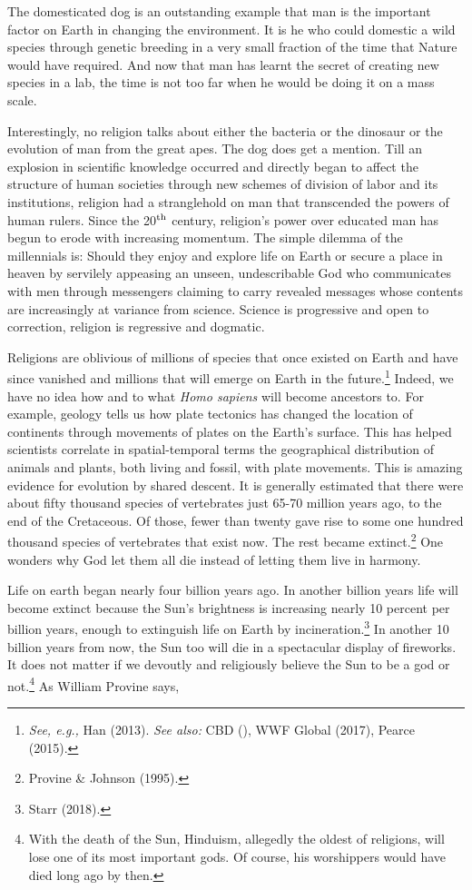 \begin{multicols}{2}
The domesticated dog is an outstanding example that man is the important factor on Earth in changing the environment. It is he who could domestic a wild species through genetic breeding in a very small fraction of the time that Nature would have required. And now that man has learnt the secret of creating new species in a lab, the time is not too far when he would be doing it on a mass scale.

Interestingly, no religion talks about either the bacteria or the dinosaur or the evolution of man from the great apes. The dog does get a mention. Till an explosion in scientific knowledge occurred and directly began to affect the structure of human societies through new schemes of division of labor and its institutions, religion had a stranglehold on man that transcended the powers of human rulers. Since the 20$^{\rm{ th}}$ century, religion's power over educated man has begun to erode with increasing momentum. The simple dilemma of the millennials is: Should they enjoy and explore life on Earth or secure a place in heaven by servilely appeasing an unseen, undescribable God who communicates with men through messengers claiming to carry revealed messages whose contents are increasingly at variance from science. Science is progressive and open to correction, religion is regressive and dogmatic.

Religions are oblivious of millions of species that once existed on Earth and have since vanished and millions that will emerge on Earth in the future.\footnote{\textit{See, e.g.,} Han (2013). \textit{See also:} CBD (), WWF Global (2017), Pearce (2015).} Indeed, we have no idea how and to what \textit{Homo sapiens} will become ancestors to. For example, geology tells us how plate tectonics has changed the location of continents through movements of plates on the Earth's surface. This has helped scientists correlate in spatial-temporal terms the geographical distribution of animals and plants, both living and fossil, with plate movements. This is amazing evidence for evolution by shared descent. It is generally estimated that there were about fifty thousand species of vertebrates just 65-70 million years ago, to the end of the Cretaceous. Of those, fewer than twenty gave rise to some one hundred thousand species of vertebrates that exist now. The rest became extinct.\footnote{Provine \& Johnson (1995).}  One wonders why God let them all die instead of letting them live in harmony.

Life on earth began nearly four billion years ago. In another billion years life will become extinct because the Sun's brightness is increasing nearly 10 percent per billion years, enough to extinguish life on Earth by incineration.\footnote{Starr (2018).} In another 10 billion years from now, the Sun too will die in a spectacular display of fireworks. It does not matter if we devoutly and religiously believe the Sun to be a god or not.\footnote{With the death of the Sun, Hinduism, allegedly the oldest of religions, will lose one of its most important gods. Of course, his worshippers would have died long ago by then.} As William Provine says,


\end{multicols}
